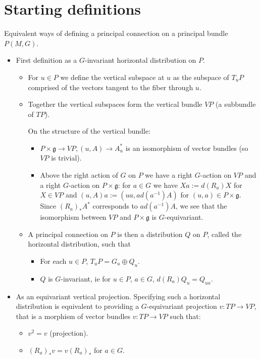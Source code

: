 \documentclass{report}
\theoremstyle{definition}
\begin{document}
\section{Starting definitions}

Equivalent ways of defining a principal connection on a principal bundle $P(M,G)$.
\begin{itemize}
    \item First definition as a $G$-invariant horizontal distribution on $P$.
    \begin{itemize}
        \item For $u\in P$ we define the vertical subspace at $u$ as the subspace of $T_uP$ comprised of the vectors tangent to the fiber through $u$.

        \item Together the vertical subspaces form the vertical bundle $VP$ (a subbundle of $TP$).

        On the structure of the vertical bundle:
        \begin{itemize}
            \item $P\times\mathfrak{g}\to VP,(u,A)\to A^*_u$ is an isomorphism of vector bundles (so $VP$ is trivial).
            \item Above the right action of $G$ on $P$ we have a right $G$-action on $VP$ and a right $G$-action on $P\times\mathfrak{g}$: for $a\in G$ we have $Xa:=d(R_a)X$ for $X\in VP$ and $(u,A)a:=(ua,ad(a^{-1})A)$ for $(u,a)\in P\times\mathfrak{g}$.
            \times Since $(R_a)_*A^*$ corresponds to $ad(a^{-1})A$, we see that the isomorphism between $VP$ and $P\times\mathfrak{g}$ is $G$-equivariant.
        \end{itemize}
        \item A principal connection on $P$ is then a distribution $Q$ on $P$, called the horizontal distribution, such that
        \begin{itemize}
            \item For each $u\in P$, $T_uP=G_u\oplus Q_u$.
            \item $Q$ is $G$-invariant, ie for $u\in P$, $a\in G$, $d(R_a)Q_u=Q_{ua}$.
        \end{itemize}
    \end{itemize}
    \item As an equivariant vertical projection. Specifying such a horizontal distribution is equivalent to providing a $G$-equivariant projection $v:TP\to VP$, that is a morphism of vector bundles $v:TP\to VP$ such that:
    \begin{itemize}
        \item $v^2=v$ (projection).
        \item $(R_a)_*v=v(R_a)_*$ for $a\in G$.
    \end{itemize}


\end{itemize}
\end{document}
